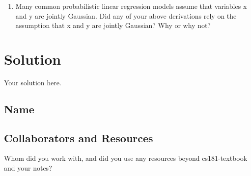 \documentclass[submit]{harvardml}
\newenvironment{solution}
  {\color{blue}\section*{Solution}}
{}
\begin{document}
\begin{problem}
\begin{enumerate}
\item Many common probabilistic linear regression models assume that
  variables x and y are jointly Gaussian.  Did any of your above
  derivations rely on the assumption that x and y are jointly
  Gaussian?  Why or why not?
    
\end{enumerate}
  
\end{problem}

\begin{solution}
	Your solution here.
\end{solution}

\newpage
\subsection*{Name}

\subsection*{Collaborators and Resources}
Whom did you work with, and did you use any resources beyond cs181-textbook and your notes?
\end{document}
